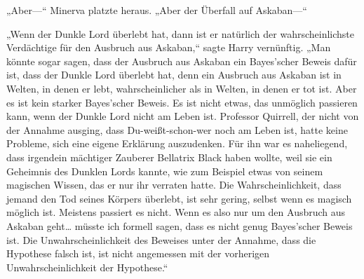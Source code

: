 „Aber—“ Minerva platzte heraus. „Aber der Überfall auf Askaban—“

„Wenn der Dunkle Lord überlebt hat, dann ist er natürlich der wahrscheinlichste Verdächtige für den Ausbruch aus Askaban,“ sagte Harry vernünftig. „Man könnte sogar sagen, dass der Ausbruch aus Askaban ein Bayes'scher Beweis dafür ist, dass der Dunkle Lord überlebt hat, denn ein Ausbruch aus Askaban ist in Welten, in denen er lebt, wahrscheinlicher als in Welten, in denen er tot ist. Aber es ist kein starker Bayes'scher Beweis. Es ist nicht etwas, das unmöglich passieren kann, wenn der Dunkle Lord nicht am Leben ist. Professor Quirrell, der nicht von der Annahme ausging, dass Du-weißt-schon-wer noch am Leben ist, hatte keine Probleme, sich eine eigene Erklärung auszudenken. Für ihn war es naheliegend, dass irgendein mächtiger Zauberer Bellatrix Black haben wollte, weil sie ein Geheimnis des Dunklen Lords kannte, wie zum Beispiel etwas von seinem magischen Wissen, das er nur ihr verraten hatte. Die Wahrscheinlichkeit, dass jemand den Tod seines Körpers überlebt, ist sehr gering, selbst wenn es magisch möglich ist. Meistens passiert es nicht. Wenn es also nur um den Ausbruch aus Askaban geht… müsste ich formell sagen, dass es nicht genug Bayes'scher Beweis ist. Die Unwahrscheinlichkeit des Beweises unter der Annahme, dass die Hypothese falsch ist, ist nicht angemessen mit der vorherigen Unwahrscheinlichkeit der Hypothese.“

